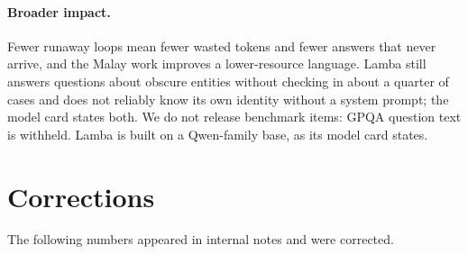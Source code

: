 \documentclass[11pt]{article}
\begin{document}
\paragraph{Broader impact.} Fewer runaway loops mean fewer wasted tokens and fewer answers that never arrive, and the Malay work improves a lower-resource language. Lamba still answers questions about obscure entities without checking in about a quarter of cases and does not reliably know its own identity without a system prompt; the model card states both. We do not release benchmark items: GPQA question text is withheld. Lamba is built on a Qwen-family base, as its model card states.




\appendix

\section{Corrections}
\label{app:retractions}

The following numbers appeared in internal notes and were corrected.
\end{document}
